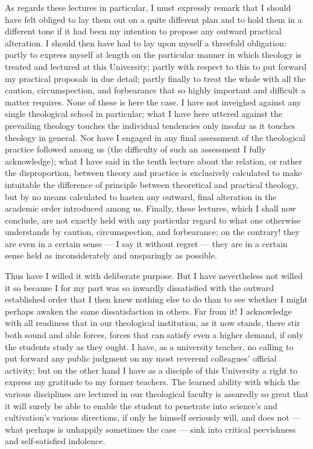 \documentclass[12pt,a4paper]{book}
\begin{document}
As regards these lectures in particular, I must expressly remark that I should have felt obliged to lay
them out on a quite different plan and to hold them in a different tone if it had been my intention to
propose any outward practical alteration. I should then have had to lay upon myself a threefold
obligation: partly to express myself at length on the particular manner in which theology is treated and
lectured at this University;
partly with respect to this to put forward my practical proposals in due detail; partly finally to treat
the whole with all the caution, circumspection, and forbearance that so highly important and difficult a
matter requires. None of these is here the case. I have not inveighed against any single theological
school in particular; what I have here uttered against the prevailing theology touches the individual
tendencies only insofar as it touches theology in general. Nor have I engaged in any final assessment of
the theological practice followed among us (the difficulty of such an assessment I fully acknowledge);
what I have said in the tenth lecture about the relation, or rather the disproportion, between theory and
practice is exclusively calculated to make intuitable the difference of principle between theoretical and
practical theology, but by no means calculated to hasten any outward, final alteration in the academic
order introduced among us. Finally, these lectures, which I shall now conclude, are not exactly held with
any particular regard to what one otherwise understands by caution, circumspection, and forbearance; on
the contrary!
they are even in a certain sense --- I say it without regret --- they are in a certain sense held as
inconsiderately and unsparingly as possible.

Thus have I willed it with deliberate purpose. But I have nevertheless not willed it so because I for my
part was so inwardly dissatisfied with the outward established order that I then knew nothing else to do
than to see whether I might perhaps awaken the same dissatisfaction in others. Far from it! I acknowledge
with all readiness that in our theological institution, as it now stands, there stir both sound and able
forces, forces that can satisfy even a higher demand, if only the students study as they ought. I have, as
a university teacher, no calling to put forward any public judgment on my most reverend colleagues' official
activity; but on the other hand I have as a disciple of this University a right to express my gratitude to
my former teachers. The learned ability with which the various disciplines are lectured in our theological
faculty is assuredly so great that it will surely be able to enable the student to penetrate into science's
and cultivation's various directions, if only he himself seriously will, and does not --- what perhaps is
unhappily sometimes the case --- sink into critical peevishness and self-satisfied indolence.
\end{document}
